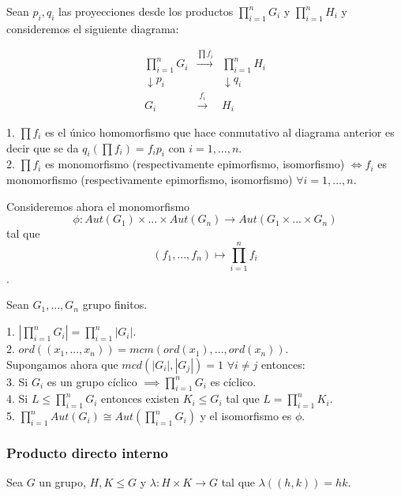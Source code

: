 Sean $p_i,q_i$ las proyecciones desde los productos $\prod_{i=1}^{n} G_i$ y $\prod_{i=1}^{n} H_i$ y consideremos el siguiente diagrama:

$$
\begin{matrix}
\prod_{i=1}^{n} G_i&\stackrel{\prod f_i}{\longrightarrow}&\prod_{i=1}^{n} H_i\\
\downarrow{p_i}&&\downarrow{q_i}\\
G_i&\stackrel{f_i}{\longrightarrow}&H_i
\end{matrix}
$$

\begin{proposition}
1. $\prod f_i$ es el único homomorfismo que hace conmutativo al diagrama anterior es decir que se da $q_i(\prod f_i) = f_i p_i$ con $i=1,...,n$.\\
2. $\prod f_i$ es monomorfismo (respectivamente epimorfismo, isomorfismo) $\iff f_i$ es monomorfismo (respectivamente epimorfismo, isomorfismo) $\forall i=1,...,n$.
\end{proposition}

Consideremos ahora el monomorfismo $$\phi:Aut(G_1) \times ... \times Aut(G_n) \rightarrow Aut(G_1 \times ... \times G_n)$$ tal que $$(f_1,...,f_n) \mapsto \prod_{i=1}^{n} f_i$$.

\begin{theorem}
Sean $G_1,...,G_n$ grupo finitos.

1. $|\prod_{i=1}^{n} G_i| = \prod_{i=1}^{n} |G_i|$.\\
2. $ord((x_1,...,x_n)) = mcm(ord(x_1),...,ord(x_n))$.\\
Supongamos ahora que $mcd(|G_i|,|G_j|) = 1$ $\forall i \neq j$ entonces:\\
3. Si $G_i$ es un grupo cíclico $\implies \prod_{i=1}^{n} G_i$ es cíclico.\\
4. Si $L \le \prod_{i=1}^{n} G_i$ entonces existen $K_i \le G_i$ tal que $L = \prod_{i=1}^{n} K_i$.\\
5. $\prod_{i=1}^{n} Aut(G_i) \cong Aut(\prod_{i=1}^{n} G_i)$ y el isomorfismo es $\phi$.
\end{theorem}

\subsubsection{Producto directo interno}

Sea $G$ un grupo, $H,K \le G$ y $\lambda:H \times K \rightarrow G$ tal que $\lambda((h,k)) = hk$.

